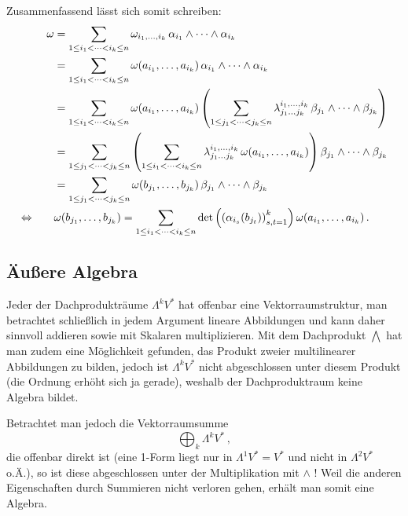 \documentclass[../H_Analysis_main.tex]{subfiles}
\begin{document}
Zusammenfassend lässt sich somit schreiben:
\begin{align*}
\omega &= \sum_{1 \leq i_1 < \dots < i_k \leq n} \omega_{i_1, \dots, i_k} \, \alpha_{i_1} \wedge \dots \wedge \alpha_{i_k}
\\
&= \sum_{1 \leq i_1 < \dots < i_k \leq n} \omega(a_{i_1}, \dots, a_{i_k}) \, \alpha_{i_1} \wedge \dots \wedge \alpha_{i_k}
\\
&= \sum_{1 \leq i_1 < \dots < i_k \leq n} \omega(a_{i_1}, \dots, a_{i_k}) \, \qty(\sum_{1 \leq j_1 < \dots < j_k \leq n} \lambda_{j_1 \dots j_k}^{i_1, \dots, i_k} \, \beta_{j_1} \wedge \dots \wedge \beta_{j_k})
\\
&= \sum_{1 \leq j_1 < \dots < j_k \leq n} \qty(\sum_{1 \leq i_1 < \dots < i_k \leq n} \lambda_{j_1 \dots j_k}^{i_1, \dots, i_k} \, \omega(a_{i_1}, \dots, a_{i_k})) \, \beta_{j_1} \wedge \dots \wedge \beta_{j_k}
\\
&= \sum_{1 \leq j_1 < \dots < j_k \leq n} \omega(b_{j_1}, \dots, b_{j_k}) \, \beta_{j_1} \wedge \dots \wedge \beta_{j_k}
\\
\Leftrightarrow \qquad &\omega(b_{j_1}, \dots, b_{j_k}) = \sum_{1 \leq i_1 < \dots < i_k \leq n} \det\qty(\qty(\alpha_{i_s}(b_{j_t}))_{s, t = 1}^k) \, \omega(a_{i_1}, \dots, a_{i_k}) \, .
\end{align*}



		\subsection{Äußere Algebra}
Jeder der Dachprodukträume $\Lambda^k V^*$ hat offenbar eine Vektorraumstruktur, man betrachtet schließlich in jedem Argument lineare Abbildungen und kann daher sinnvoll addieren sowie mit Skalaren multiplizieren. Mit dem Dachprodukt $\bigwedge$ hat man zudem eine Möglichkeit gefunden, das Produkt zweier multilinearer Abbildungen zu bilden, jedoch ist $\Lambda^k V^*$ nicht abgeschlossen unter diesem Produkt (die Ordnung erhöht sich ja gerade), weshalb der Dachproduktraum keine Algebra bildet.


Betrachtet man jedoch die Vektorraumsumme
\begin{equation*}
\bigoplus_k \Lambda^k V^* \, ,
\end{equation*}
die offenbar direkt ist (eine 1-Form liegt nur in $\Lambda^1 V^* = V^*$ und nicht in $\Lambda^2 V^*$ o.Ä.), so ist diese abgeschlossen unter der Multiplikation mit $\wedge$ ! Weil die anderen Eigenschaften durch Summieren nicht verloren gehen, erhält man somit eine Algebra.
\end{document}
